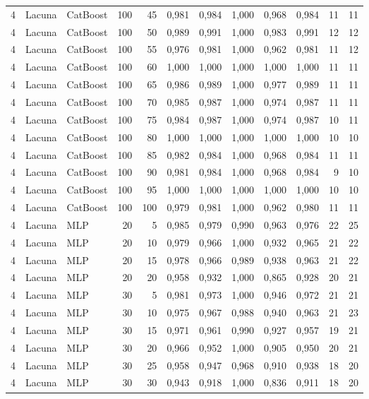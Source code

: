\begin{longtable}{@{}rllrrrrrrrrr@{}}
4 & Lacuna & CatBoost & 100 & 45 & 0,981 & 0,984 & 1,000 & 0,968 & 0,984 & 11 & 11 \\
4 & Lacuna & CatBoost & 100 & 50 & 0,989 & 0,991 & 1,000 & 0,983 & 0,991 & 12 & 12 \\
4 & Lacuna & CatBoost & 100 & 55 & 0,976 & 0,981 & 1,000 & 0,962 & 0,981 & 11 & 12 \\
4 & Lacuna & CatBoost & 100 & 60 & 1,000 & 1,000 & 1,000 & 1,000 & 1,000 & 11 & 11 \\
4 & Lacuna & CatBoost & 100 & 65 & 0,986 & 0,989 & 1,000 & 0,977 & 0,989 & 11 & 11 \\
4 & Lacuna & CatBoost & 100 & 70 & 0,985 & 0,987 & 1,000 & 0,974 & 0,987 & 11 & 11 \\
4 & Lacuna & CatBoost & 100 & 75 & 0,984 & 0,987 & 1,000 & 0,974 & 0,987 & 10 & 11 \\
4 & Lacuna & CatBoost & 100 & 80 & 1,000 & 1,000 & 1,000 & 1,000 & 1,000 & 10 & 10 \\
4 & Lacuna & CatBoost & 100 & 85 & 0,982 & 0,984 & 1,000 & 0,968 & 0,984 & 11 & 11 \\
4 & Lacuna & CatBoost & 100 & 90 & 0,981 & 0,984 & 1,000 & 0,968 & 0,984 & 9 & 10 \\
4 & Lacuna & CatBoost & 100 & 95 & 1,000 & 1,000 & 1,000 & 1,000 & 1,000 & 10 & 10 \\
4 & Lacuna & CatBoost & 100 & 100 & 0,979 & 0,981 & 1,000 & 0,962 & 0,980 & 11 & 11 \\
4 & Lacuna & MLP & 20 & 5 & 0,985 & 0,979 & 0,990 & 0,963 & 0,976 & 22 & 25 \\
4 & Lacuna & MLP & 20 & 10 & 0,979 & 0,966 & 1,000 & 0,932 & 0,965 & 21 & 22 \\
4 & Lacuna & MLP & 20 & 15 & 0,978 & 0,966 & 0,989 & 0,938 & 0,963 & 21 & 22 \\
4 & Lacuna & MLP & 20 & 20 & 0,958 & 0,932 & 1,000 & 0,865 & 0,928 & 20 & 21 \\
4 & Lacuna & MLP & 30 & 5 & 0,981 & 0,973 & 1,000 & 0,946 & 0,972 & 21 & 21 \\
4 & Lacuna & MLP & 30 & 10 & 0,975 & 0,967 & 0,988 & 0,940 & 0,963 & 21 & 23 \\
4 & Lacuna & MLP & 30 & 15 & 0,971 & 0,961 & 0,990 & 0,927 & 0,957 & 19 & 21 \\
4 & Lacuna & MLP & 30 & 20 & 0,966 & 0,952 & 1,000 & 0,905 & 0,950 & 20 & 21 \\
4 & Lacuna & MLP & 30 & 25 & 0,958 & 0,947 & 0,968 & 0,910 & 0,938 & 18 & 20 \\
4 & Lacuna & MLP & 30 & 30 & 0,943 & 0,918 & 1,000 & 0,836 & 0,911 & 18 & 20 \\

\end{longtable}
